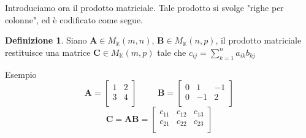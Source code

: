 \documentclass[a4paper, 12pt]{article}
\theoremstyle{definition}
\newtheorem{defn}[thm]{Definizione}
\begin{document}
\newpage
\noindent Introduciamo ora il prodotto matriciale. Tale prodotto si svolge "righe per colonne", ed è codificato come segue.
\begin{defn}
Siano $\boldsymbol{A} \in  M_\mathds{K}(m,n)$, $\boldsymbol{B} \in  M_\mathds{K}(n,p)$, il prodotto matriciale restituisce una matrice $\boldsymbol{C} \in  M_\mathds{K}(m, p)$ tale che 
 $c_{ij} = \sum\limits_{k = 1}^n{a_{ik}b_{kj}} $
\end{defn} 
\noindent Esempio
\[ \boldsymbol{A} =\begin{bmatrix}
    1 & 2 \\
    3 & 4 \\
\end{bmatrix}
\hspace{1cm}
\boldsymbol{B} =\begin{bmatrix}
    0 & 1  & -1\\
    0 & -1 & 2 \\
\end{bmatrix}
\]
\medbreak
\[
\boldsymbol{C} = \boldsymbol{AB} = \begin{bmatrix}
    c_{11} & c_{12} & c_{13} \\
    c_{21} & c_{22} & c_{23} \\
\end{bmatrix}
\]
\end{document}
